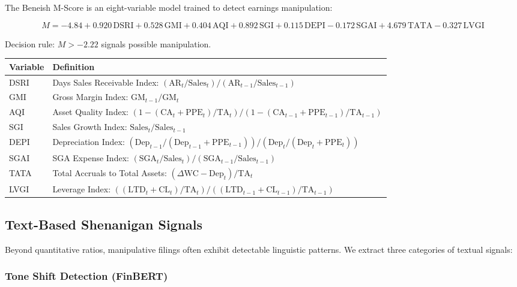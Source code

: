 \documentclass[12pt, a4paper]{article}
\begin{document}
The Beneish M-Score \citep{beneish1999} is an eight-variable model trained to detect earnings manipulation:

\begin{equation}
  M = -4.84 + 0.920\,\text{DSRI} + 0.528\,\text{GMI} + 0.404\,\text{AQI} + 0.892\,\text{SGI}
      + 0.115\,\text{DEPI} - 0.172\,\text{SGAI} + 4.679\,\text{TATA} - 0.327\,\text{LVGI}
  \label{eq:beneish}
\end{equation}

Decision rule: $M > -2.22$ signals possible manipulation.

\begin{center}
\begin{tabularx}{\linewidth}{l X}
  \toprule
  \textbf{Variable} & \textbf{Definition} \\
  \midrule
  DSRI & Days Sales Receivable Index: $(\text{AR}_t/\text{Sales}_t) / (\text{AR}_{t-1}/\text{Sales}_{t-1})$ \\
  GMI  & Gross Margin Index: $\text{GM}_{t-1} / \text{GM}_t$ \\
  AQI  & Asset Quality Index: $(1 - (\text{CA}_t + \text{PPE}_t)/\text{TA}_t) / (1 - (\text{CA}_{t-1} + \text{PPE}_{t-1})/\text{TA}_{t-1})$ \\
  SGI  & Sales Growth Index: $\text{Sales}_t / \text{Sales}_{t-1}$ \\
  DEPI & Depreciation Index: $(\text{Dep}_{t-1}/(\text{Dep}_{t-1}+\text{PPE}_{t-1})) / (\text{Dep}_t/(\text{Dep}_t+\text{PPE}_t))$ \\
  SGAI & SGA Expense Index: $(\text{SGA}_t/\text{Sales}_t) / (\text{SGA}_{t-1}/\text{Sales}_{t-1})$ \\
  TATA & Total Accruals to Total Assets: $(\Delta\text{WC} - \text{Dep}_t) / \text{TA}_t$ \\
  LVGI & Leverage Index: $((\text{LTD}_t + \text{CL}_t)/\text{TA}_t) / ((\text{LTD}_{t-1}+\text{CL}_{t-1})/\text{TA}_{t-1})$ \\
  \bottomrule
\end{tabularx}
\end{center}

\subsection{Text-Based Shenanigan Signals}

Beyond quantitative ratios, manipulative filings often exhibit detectable linguistic patterns.  We extract three categories of textual signals:

\subsubsection{Tone Shift Detection (FinBERT)}
\end{document}
